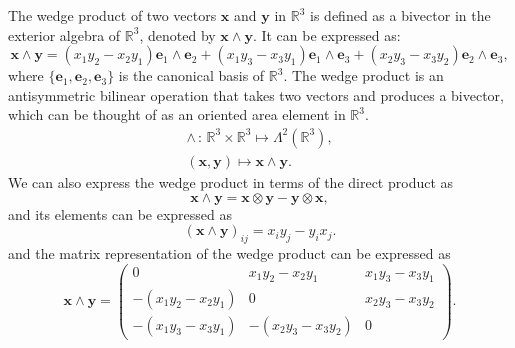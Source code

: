 \begin{definition}
    The wedge product of two vectors \(\mathbf{x}\) and \(\mathbf{y}\) in \(\mathbb{R}^3\) is defined as a bivector in the exterior algebra of \(\mathbb{R}^3\), denoted by \(\mathbf{x} \wedge \mathbf{y}\). It can be expressed as:
    \[
        \mathbf{x} \wedge \mathbf{y} = (x_1 y_2 - x_2 y_1) \mathbf{e}_1 \wedge \mathbf{e}_2 + (x_1 y_3 - x_3 y_1) \mathbf{e}_1 \wedge \mathbf{e}_3 + (x_2 y_3 - x_3 y_2) \mathbf{e}_2 \wedge \mathbf{e}_3,
    \]
    where \(\{\mathbf{e}_1, \mathbf{e}_2, \mathbf{e}_3\}\) is the canonical basis of \(\mathbb{R}^3\). The wedge product is an antisymmetric bilinear operation that takes two vectors and produces a bivector, which can be thought of as an oriented area element in \(\mathbb{R}^3\).
    \[
        \begin{aligned}
            \wedge \, : \, \mathbb{R}^3 \times \mathbb{R}^3 \mapsto \Lambda^2(\mathbb{R}^3), \\
            (\mathbf{x}, \mathbf{y}) \mapsto \mathbf{x} \wedge \mathbf{y}.
        \end{aligned}
    \]
    We can also express the wedge product in terms of the direct product as
    \[
        \mathbf{x} \wedge \mathbf{y} = \mathbf{x} \otimes \mathbf{y} - \mathbf{y} \otimes \mathbf{x},
    \]
    and its elements can be expressed as
    \[
        (\mathbf{x} \wedge \mathbf{y})_{ij} = x_i y_j - y_i x_j.
    \]
    and the matrix representation of the wedge product can be expressed as
    \[
        \mathbf{x} \wedge \mathbf{y} = \begin{pmatrix}
            0                    & x_1 y_2 - x_2 y_1    & x_1 y_3 - x_3 y_1 \\
            -(x_1 y_2 - x_2 y_1) & 0                    & x_2 y_3 - x_3 y_2 \\
            -(x_1 y_3 - x_3 y_1) & -(x_2 y_3 - x_3 y_2) & 0
        \end{pmatrix}.
    \]
\end{definition}

